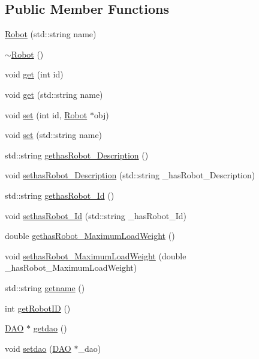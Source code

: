 \subsection*{Public Member Functions}
\begin{DoxyCompactItemize}
\item 
\hyperlink{class_robot_a76bf162c87054d8f1b3c6e1656caf46b}{Robot} (std::string name)
\item 
\hyperlink{class_robot_a924320124b09c2f2ac1621aa210d5f38}{$\sim$Robot} ()
\item 
void \hyperlink{class_robot_a75eff0f204a90f564d474b357a02d723}{get} (int id)
\item 
void \hyperlink{class_robot_a79bf7a499a3860c351abf981b8e19fbf}{get} (std::string name)
\item 
void \hyperlink{class_robot_a33cea343a42a928248d9fd6a9ea14190}{set} (int id, \hyperlink{class_robot}{Robot} $\ast$obj)
\item 
void \hyperlink{class_robot_a9ca310b2961355e152a5503961538ed5}{set} (std::string name)
\item 
std::string \hyperlink{class_robot_ac75e41520ffc4a4e87320ed40031eda1}{gethasRobot\_\-Description} ()
\item 
void \hyperlink{class_robot_af717a24cf6a287927a0ae443c41cc0ef}{sethasRobot\_\-Description} (std::string \_\-hasRobot\_\-Description)
\item 
std::string \hyperlink{class_robot_a90300f528b69a6aea61a4172831317c0}{gethasRobot\_\-Id} ()
\item 
void \hyperlink{class_robot_a179136af9c62b96b5015d74e09c1830e}{sethasRobot\_\-Id} (std::string \_\-hasRobot\_\-Id)
\item 
double \hyperlink{class_robot_a741aa9eb355882ad44f03b7d32818e24}{gethasRobot\_\-MaximumLoadWeight} ()
\item 
void \hyperlink{class_robot_ac919aa098f4421feb4a70912863a2a94}{sethasRobot\_\-MaximumLoadWeight} (double \_\-hasRobot\_\-MaximumLoadWeight)
\item 
std::string \hyperlink{class_robot_ac68a539590d0fe227c07da18077e4085}{getname} ()
\item 
int \hyperlink{class_robot_aec8db41d0995aca0c76095ad0e01f400}{getRobotID} ()
\item 
\hyperlink{class_d_a_o}{DAO} $\ast$ \hyperlink{class_robot_aeffa0adbec7c1c9ff0a628a69cb799fc}{getdao} ()
\item 
void \hyperlink{class_robot_a76c8a66cbeb73f9fa9c0960105c2f355}{setdao} (\hyperlink{class_d_a_o}{DAO} $\ast$\_\-dao)

\end{DoxyCompactItemize}

